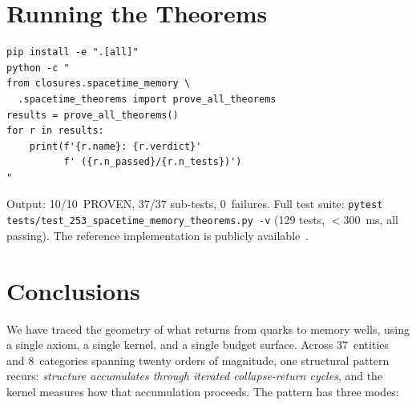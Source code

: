 \documentclass[
  aps,
  prd,
  twocolumn,
  superscriptaddress,
  nofootinbib,
  floatfix
]{revtex4-2}
\begin{document}
\section{Running the Theorems}\label{sec:howto}

\begin{verbatim}
pip install -e ".[all]"
python -c "
from closures.spacetime_memory \
  .spacetime_theorems import prove_all_theorems
results = prove_all_theorems()
for r in results:
    print(f'{r.name}: {r.verdict}'
          f' ({r.n_passed}/{r.n_tests})')
"
\end{verbatim}

Output: 10/10~PROVEN, 37/37 sub-tests, 0~failures.
Full test suite: \texttt{pytest
tests/test\_253\_spacetime\_memory\_theorems.py -v}
(129 tests, $< 300$~ms, all passing).
The reference implementation is publicly
available~\cite{umcpmetadatarepo}.


\section{Conclusions}\label{sec:conclusions}

We have traced the geometry of what returns from quarks to
memory wells, using a single axiom, a single kernel, and a
single budget surface.  Across 37~entities and 8~categories
spanning twenty orders of magnitude, one structural pattern
recurs: \emph{structure accumulates through iterated
collapse-return cycles}, and the kernel measures how that
accumulation proceeds.  The pattern has three modes:
\end{document}
